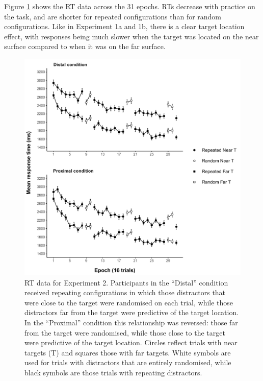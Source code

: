 \documentclass[
  man,floatsintext]{apa7}
\begin{document}
Figure \ref{fig:Exp2-RT-figure} shows the RT data across the 31 epochs. RTs decrease with practice on the task, and are shorter for repeated configurations than for random configurations. Like in Experiment 1a and 1b, there is a clear target location effect, with responses being much slower when the target was located on the near surface compared to when it was on the far surface.



\begin{figure}

{\centering \includegraphics{CCVR_manuscript_files/figure-latex/Exp2-RT-figure-1} 

}

\caption{RT data for Experiment 2. Participants in the ``Distal'' condition received repeating configurations in which those distractors that were close to the target were randomised on each trial, while those distractors far from the target were predictive of the target location. In the ``Proximal'' condition this relationship was reversed: those far from the target were randomised, while those close to the target were predictive of the target location. Circles reflect trials with near targets (T) and squares those with far targets. White symbols are used for trials with distractors that are entirely randomised, while black symbols are those trials with repeating distractors.}\label{fig:Exp2-RT-figure}
\end{figure}
\end{document}
